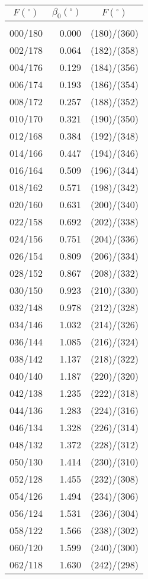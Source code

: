 \newpage
\begin{table}\centering
\small{ \begin{tabular}{crc}
$F (^\circ)$ & $\beta_0(^\circ)$ &
$F (^\circ)$ \\\hline
&&\\[-1.75ex]
000/180 &  0.000 & (180)/(360)\\
002/178 &  0.064 & (182)/(358)\\
004/176 &  0.129 & (184)/(356)\\
006/174 &  0.193 & (186)/(354)\\
008/172 &  0.257 & (188)/(352)\\
010/170 &  0.321 & (190)/(350)\\
012/168 &  0.384 & (192)/(348)\\
014/166 &  0.447 & (194)/(346)\\
016/164 &  0.509 & (196)/(344)\\
018/162 &  0.571 & (198)/(342)\\
020/160 &  0.631 & (200)/(340)\\
022/158 &  0.692 & (202)/(338)\\
024/156 &  0.751 & (204)/(336)\\
026/154 &  0.809 & (206)/(334)\\
028/152 &  0.867 & (208)/(332)\\
030/150 &  0.923 & (210)/(330)\\
032/148 &  0.978 & (212)/(328)\\
034/146 &  1.032 & (214)/(326)\\
036/144 &  1.085 & (216)/(324)\\
038/142 &  1.137 & (218)/(322)\\
040/140 &  1.187 & (220)/(320)\\
042/138 &  1.235 & (222)/(318)\\
044/136 &  1.283 & (224)/(316)\\
046/134 &  1.328 & (226)/(314)\\
048/132 &  1.372 & (228)/(312)\\
050/130 &  1.414 & (230)/(310)\\
052/128 &  1.455 & (232)/(308)\\
054/126 &  1.494 & (234)/(306)\\
056/124 &  1.531 & (236)/(304)\\
058/122 &  1.566 & (238)/(302)\\
060/120 &  1.599 & (240)/(300)\\
062/118 &  1.630 & (242)/(298)\\

\end{tabular}}
\end{table}
